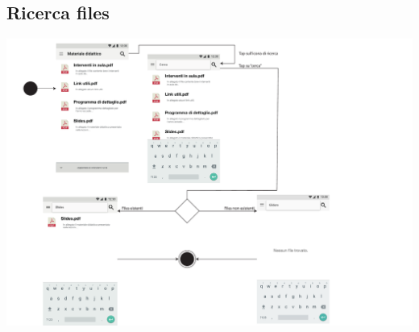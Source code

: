 \subsection{Ricerca files}
\begin{center}
	\includegraphics[width=6in]{imgs/gruppo1/activity_diagrams/AD14_ricerca_file.pdf}
\end{center}
\newpage


